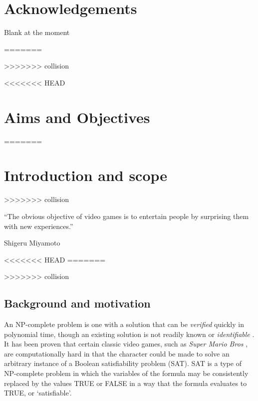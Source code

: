 \documentclass[11pt, a4paper, oneside]{report} %
\begin{document}

\chapter*{Acknowledgements}

Blank at the moment


\tableofcontents
=======




\tableofcontents



>>>>>>> collision



<<<<<<< HEAD
\chapter{Aims and Objectives}
=======
\chapter{Introduction and scope}
>>>>>>> collision


\epigraph{``The obvious objective of video games is to entertain people by
surprising them with new experiences.''}{Shigeru Miyamoto}

<<<<<<< HEAD
=======

>>>>>>> collision
\section{Background and motivation}

An NP-complete problem is one with a solution that can be \textit{verified}
quickly in polynomial time, though an existing solution is not readily known or
\textit{identifiable} \cite{cook1984can}. It has been proven that certain
classic video games, such as \textit{Super Mario Bros} \cite{Aloupis2012}, are
computationally hard in that the character could be made to solve an arbitrary
instance of a Boolean satisfiability problem (SAT). SAT is a type of NP-complete
problem in which the variables of the formula may be consistently replaced by
the values TRUE or FALSE in a way that the formula evaluates to TRUE, or
`satisfiable'.
\end{document}
